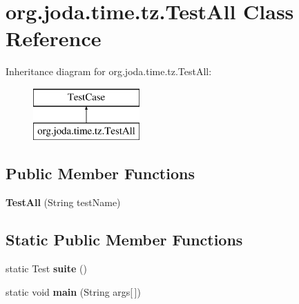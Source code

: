 \hypertarget{classorg_1_1joda_1_1time_1_1tz_1_1_test_all}{\section{org.\-joda.\-time.\-tz.\-Test\-All Class Reference}
\label{classorg_1_1joda_1_1time_1_1tz_1_1_test_all}
}
Inheritance diagram for org.\-joda.\-time.\-tz.\-Test\-All\-:\begin{figure}[H]
\begin{center}
\leavevmode
\includegraphics[height=2.000000cm]{classorg_1_1joda_1_1time_1_1tz_1_1_test_all}
\end{center}
\end{figure}
\subsection*{Public Member Functions}
\begin{DoxyCompactItemize}
\item 
\hypertarget{classorg_1_1joda_1_1time_1_1tz_1_1_test_all_a7c5c215f1f280c34485086ec957489bf}{{\bfseries Test\-All} (String test\-Name)}\label{classorg_1_1joda_1_1time_1_1tz_1_1_test_all_a7c5c215f1f280c34485086ec957489bf}

\end{DoxyCompactItemize}
\subsection*{Static Public Member Functions}
\begin{DoxyCompactItemize}
\item 
\hypertarget{classorg_1_1joda_1_1time_1_1tz_1_1_test_all_a97ed8217ca719bca2e4751953659b310}{static Test {\bfseries suite} ()}\label{classorg_1_1joda_1_1time_1_1tz_1_1_test_all_a97ed8217ca719bca2e4751953659b310}

\item 
\hypertarget{classorg_1_1joda_1_1time_1_1tz_1_1_test_all_ad4c5163c5b7d1188f4fad6e54704355a}{static void {\bfseries main} (String args\mbox{[}$\,$\mbox{]})}\label{classorg_1_1joda_1_1time_1_1tz_1_1_test_all_ad4c5163c5b7d1188f4fad6e54704355a}

\end{DoxyCompactItemize}


